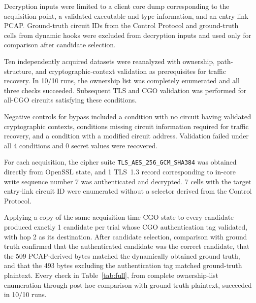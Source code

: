 \documentclass[10pt,a4paper]{article}
\newcommand{\code}[1]{\nolinkurl{#1}}
\begin{document}
Decryption inputs were limited to a client core dump corresponding to the acquisition point, a validated executable and type information, and an entry-link PCAP. Ground-truth circuit IDs from the Control Protocol and ground-truth cells from dynamic hooks were excluded from decryption inputs and used only for comparison after candidate selection.

Ten independently acquired datasets were reanalyzed with ownership, path-structure, and cryptographic-context validation as prerequisites for traffic recovery. In 10/10 runs, the ownership list was completely enumerated and all three checks succeeded. Subsequent TLS and CGO validation was performed for all-CGO circuits satisfying these conditions.

Negative controls for bypass included a condition with no circuit having validated cryptographic contexts, conditions missing circuit information required for traffic recovery, and a condition with a modified circuit address. Validation failed under all 4 conditions and 0 secret values were recovered.

For each acquisition, the cipher suite \code{TLS_AES_256_GCM_SHA384} was obtained directly from OpenSSL state, and 1 TLS~1.3 record corresponding to in-core write sequence number 7 was authenticated and decrypted. 7 cells with the target entry-link circuit ID were enumerated without a selector derived from the Control Protocol.

Applying a copy of the same acquisition-time CGO state to every candidate produced exactly 1 candidate per trial whose CGO authentication tag validated, with hop 2 as its destination. After candidate selection, comparison with ground truth confirmed that the authenticated candidate was the correct candidate, that the 509 PCAP-derived bytes matched the dynamically obtained ground truth, and that the 493 bytes excluding the authentication tag matched ground-truth plaintext. Every check in Table~\ref{tab:full}, from complete ownership-list enumeration through post hoc comparison with ground-truth plaintext, succeeded in 10/10 runs.
\end{document}

